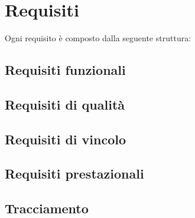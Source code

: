 \section{Requisiti}
Ogni requisito è composto dalla seguente struttura: 

\subsection{Requisiti funzionali}
\subsection{Requisiti di qualità}
\subsection{Requisiti di vincolo}
\subsection{Requisiti prestazionali}
\subsection{Tracciamento}